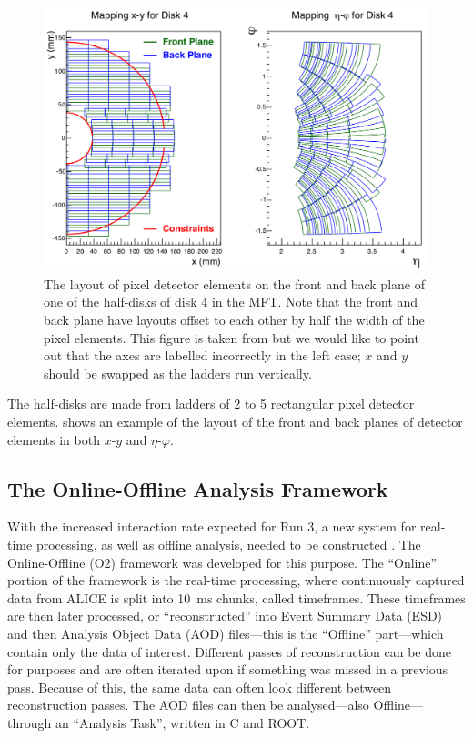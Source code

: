 \begin{figure}[h]
    \begin{center}
        \includegraphics[width=.8\textwidth]{Figs/MFT_Disk4_mapping.png}
        \caption{The layout of pixel detector elements on the front and back plane of one of the half-disks of disk 4 in the MFT. Note that the front and back plane have layouts offset to each other by half the width of the pixel elements. This figure is taken from \cite[fig.~6.1]{MFT_TDR} but we would like to point out that the axes are labelled incorrectly in the left case; $x$ and $y$ should be swapped as the ladders run vertically.}
        \label{fig:MFT_Disk4_mapping}
    \end{center}
\end{figure}

The half-disks are made from ladders of 2 to 5 rectangular pixel detector elements.  shows an example of the layout of the front and back planes of detector elements in both $x$-$y$ and $\eta$-$\varphi$. 




\subsection{The Online-Offline Analysis Framework}
With the increased interaction rate expected for Run 3, a new system for real-time processing, as well as offline analysis, needed to be constructed \cite{ALICE_Upgrade_LOI}. The Online-Offline (O2) framework was developed for this purpose. The ``Online'' portion of the framework is the real-time processing, where continuously captured data from ALICE is split into \SI{10}{\milli\second} chunks, called timeframes. These timeframes are then later processed, or ``reconstructed'' into Event Summary Data (ESD) and then Analysis Object Data (AOD) files---this is the ``Offline'' part---which contain only the data of interest. Different passes of reconstruction can be done for purposes and are often iterated upon if something was missed in a previous pass. Because of this, the same data can often look different between reconstruction passes. The AOD files can then be analysed---also Offline---through an ``Analysis Task'', written in C\OldTexttt{++} and ROOT. 

